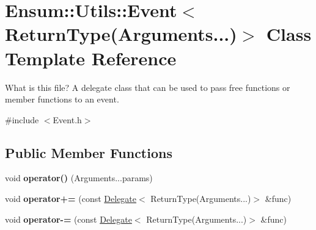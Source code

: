 \hypertarget{class_ensum_1_1_utils_1_1_event_3_01_return_type_07_arguments_8_8_8_08_4}{}\section{Ensum\+:\+:Utils\+:\+:Event$<$ Return\+Type(Arguments...)$>$ Class Template Reference}
\label{class_ensum_1_1_utils_1_1_event_3_01_return_type_07_arguments_8_8_8_08_4}


What is this file? A delegate class that can be used to pass free functions or member functions to an event.  




{\ttfamily \#include $<$Event.\+h$>$}

\subsection*{Public Member Functions}
\begin{DoxyCompactItemize}
\item 
void {\bfseries operator()} (Arguments...\+params)\hypertarget{class_ensum_1_1_utils_1_1_event_3_01_return_type_07_arguments_8_8_8_08_4_aaafdcbad1f78eb94cd611b4e759b57ba}{}\label{class_ensum_1_1_utils_1_1_event_3_01_return_type_07_arguments_8_8_8_08_4_aaafdcbad1f78eb94cd611b4e759b57ba}

\item 
void {\bfseries operator+=} (const \hyperlink{class_ensum_1_1_utils_1_1_delegate}{Delegate}$<$ Return\+Type(Arguments...)$>$ \&func)\hypertarget{class_ensum_1_1_utils_1_1_event_3_01_return_type_07_arguments_8_8_8_08_4_a06a87b057fbf7a44c57f398a4352aa73}{}\label{class_ensum_1_1_utils_1_1_event_3_01_return_type_07_arguments_8_8_8_08_4_a06a87b057fbf7a44c57f398a4352aa73}

\item 
void {\bfseries operator-\/=} (const \hyperlink{class_ensum_1_1_utils_1_1_delegate}{Delegate}$<$ Return\+Type(Arguments...)$>$ \&func)\hypertarget{class_ensum_1_1_utils_1_1_event_3_01_return_type_07_arguments_8_8_8_08_4_ad30c7d74a04c6e1a053f02f4576b8117}{}\label{class_ensum_1_1_utils_1_1_event_3_01_return_type_07_arguments_8_8_8_08_4_ad30c7d74a04c6e1a053f02f4576b8117}

\end{DoxyCompactItemize}
